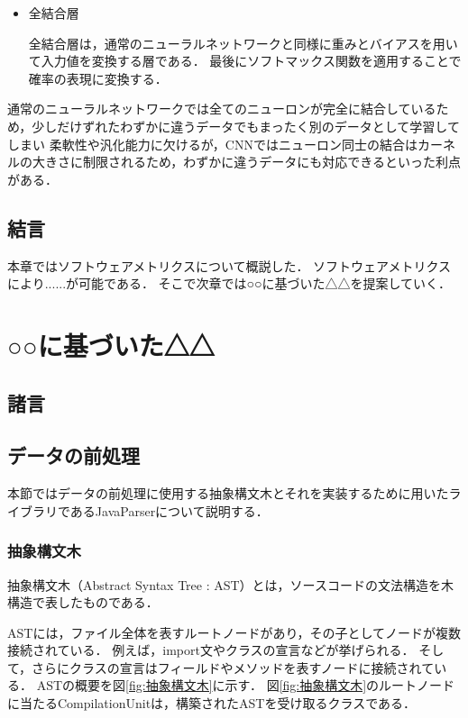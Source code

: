 \documentclass{thesis}
\begin{document}
\begin{itemize}
	\item 全結合層
	
	全結合層は，通常のニューラルネットワークと同様に重みとバイアスを用いて入力値を変換する層である．
	最後にソフトマックス関数を適用することで確率の表現に変換する．
\end{itemize}

通常のニューラルネットワークでは全てのニューロンが完全に結合しているため，少しだけずれたわずかに違うデータでもまったく別のデータとして学習してしまい
柔軟性や汎化能力に欠けるが，CNNではニューロン同士の結合はカーネルの大きさに制限されるため，わずかに違うデータにも対応できるといった利点がある．


\section{結言}

本章ではソフトウェアメトリクスについて概説した．
ソフトウェアメトリクスにより......が可能である．
そこで次章では○○に基づいた△△を提案していく．

\chapter{○○に基づいた△△}
\label{chap:提案法}

\section{諸言}

\section{データの前処理}
本節ではデータの前処理に使用する抽象構文木とそれを実装するために用いたライブラリであるJavaParserについて説明する．

\subsection{抽象構文木}
抽象構文木（Abstract Syntax Tree : AST）とは，ソースコードの文法構造を木構造で表したものである．


ASTには，ファイル全体を表すルートノードがあり，その子としてノードが複数接続されている．
例えば，import文やクラスの宣言などが挙げられる．
そして，さらにクラスの宣言はフィールドやメソッドを表すノードに接続されている．
ASTの概要を図\ref{fig:抽象構文木}に示す．
図\ref{fig:抽象構文木}のルートノードに当たるCompilationUnitは，構築されたASTを受け取るクラスである．
\end{document}
